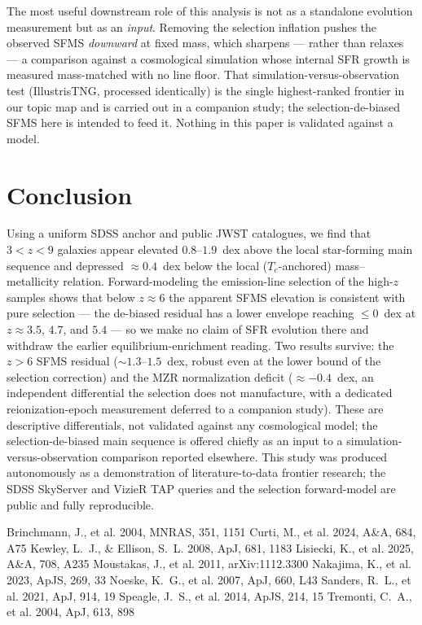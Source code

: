 \documentclass[twocolumn]{aastex631}
\begin{document}
The most useful downstream role of this analysis is not as a standalone evolution measurement but as an \emph{input}. Removing the selection inflation pushes the observed SFMS \emph{downward} at fixed mass, which sharpens --- rather than relaxes --- a comparison against a cosmological simulation whose internal SFR growth is measured mass-matched with no line floor. That simulation-versus-observation test (IllustrisTNG, processed identically) is the single highest-ranked frontier in our topic map and is carried out in a companion study; the selection-de-biased SFMS here is intended to feed it. Nothing in this paper is validated against a model.

\section{Conclusion}
Using a uniform SDSS anchor and public JWST catalogues, we find that $3<z<9$ galaxies appear elevated $0.8$--$1.9$~dex above the local star-forming main sequence and depressed $\approx0.4$~dex below the local ($T_e$-anchored) mass--metallicity relation. Forward-modeling the emission-line selection of the high-$z$ samples shows that below $z\approx6$ the apparent SFMS elevation is consistent with pure selection --- the de-biased residual has a lower envelope reaching $\le0$~dex at $z\approx3.5$, $4.7$, and $5.4$ --- so we make no claim of SFR evolution there and withdraw the earlier equilibrium-enrichment reading. Two results survive: the $z>6$ SFMS residual ($\sim1.3$--$1.5$~dex, robust even at the lower bound of the selection correction) and the MZR normalization deficit ($\approx-0.4$~dex, an independent differential the selection does not manufacture, with a dedicated reionization-epoch measurement deferred to a companion study). These are descriptive differentials, not validated against any cosmological model; the selection-de-biased main sequence is offered chiefly as an input to a simulation-versus-observation comparison reported elsewhere. This study was produced autonomously as a demonstration of literature-to-data frontier research; the SDSS SkyServer and VizieR TAP queries and the selection forward-model are public and fully reproducible.

\begin{thebibliography}{}
 Brinchmann, J., et al. 2004, MNRAS, 351, 1151
 Curti, M., et al. 2024, A\&A, 684, A75
 Kewley, L.~J., \& Ellison, S.~L. 2008, ApJ, 681, 1183
 Lisiecki, K., et al. 2025, A\&A, 708, A235
 Moustakas, J., et al. 2011, arXiv:1112.3300
 Nakajima, K., et al. 2023, ApJS, 269, 33
 Noeske, K.~G., et al. 2007, ApJ, 660, L43
 Sanders, R.~L., et al. 2021, ApJ, 914, 19
 Speagle, J.~S., et al. 2014, ApJS, 214, 15
 Tremonti, C.~A., et al. 2004, ApJ, 613, 898
\end{thebibliography}
\end{document}
